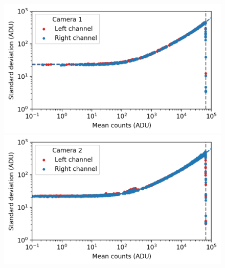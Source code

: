 \begin{colsection}
\begin{colsection}
\begin{figure}[p]
    \begin{center}
        \begin{minipage}[t]{0.49\textwidth}\vspace{10pt}
            \includegraphics[width=\linewidth]{images/detectors/ptc_1.png}
        \end{minipage}
        \begin{minipage}[t]{0.49\textwidth}\vspace{10pt}
            \includegraphics[width=\linewidth]{images/detectors/ptc_2.png}
        \end{minipage}


\end{center}
\end{figure}
\end{colsection}
\end{colsection}

